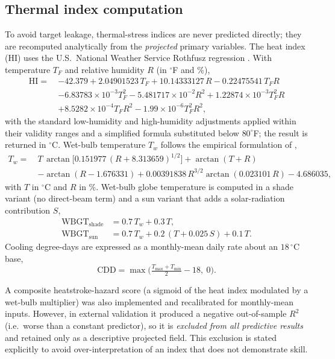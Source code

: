 \documentclass[review,11pt]{elsarticle}
\newcommand{\degC}{\ensuremath{^{\circ}\mathrm{C}}}
\begin{document}
\subsection{Thermal index computation}\label{sec:indices}
To avoid target leakage, thermal-stress indices are never predicted directly;
they are recomputed analytically from the \emph{projected} primary variables.
The heat index (HI) uses the U.S.\ National Weather Service Rothfusz regression
\citep{rothfusz1990}. With temperature $T_F$ and relative humidity $R$ (in
$^{\circ}$F and \%),
\begin{align}
\mathrm{HI} =\ & -42.379 + 2.04901523\,T_F + 10.14333127\,R
     - 0.22475541\,T_F R \nonumber\\
   & - 6.83783\!\times\!10^{-3} T_F^{2}
     - 5.481717\!\times\!10^{-2} R^{2}
     + 1.22874\!\times\!10^{-3} T_F^{2} R \nonumber\\
   & + 8.5282\!\times\!10^{-4} T_F R^{2}
     - 1.99\!\times\!10^{-6} T_F^{2} R^{2},
\label{eq:hi}
\end{align}
with the standard low-humidity and high-humidity adjustments applied within
their validity ranges and a simplified formula substituted below $80^{\circ}$F;
the result is returned in $\degC$. Wet-bulb temperature $T_w$ follows the
empirical formulation of \citet{stull2011},
\begin{align}
T_w =\ & T\,\arctan\!\big[0.151977\,(R+8.313659)^{1/2}\big]
       + \arctan(T+R) \nonumber\\
     & - \arctan(R-1.676331)
       + 0.00391838\,R^{3/2}\arctan(0.023101\,R) - 4.686035,
\label{eq:wetbulb}
\end{align}
with $T$ in $\degC$ and $R$ in \%. Wet-bulb globe temperature is computed in a
shade variant (no direct-beam term) and a sun variant that adds a
solar-radiation contribution $S$,
\begin{align}
\mathrm{WBGT}_{\text{shade}} &= 0.7\,T_w + 0.3\,T, \label{eq:wbgtshade}\\
\mathrm{WBGT}_{\text{sun}}   &= 0.7\,T_w + 0.2\,(T + 0.025\,S) + 0.1\,T.
\label{eq:wbgtsun}
\end{align}
Cooling degree-days are expressed as a monthly-mean daily rate about an
$18\,\degC$ base,
\begin{equation}
\mathrm{CDD}=\max\!\Big(\tfrac{T_{\max}+T_{\min}}{2}-18,\ 0\Big).
\label{eq:cdd}
\end{equation}

A composite heatstroke-hazard score (a sigmoid of the heat index modulated by a
wet-bulb multiplier) was also implemented and recalibrated for monthly-mean
inputs. However, in external validation it produced a negative out-of-sample
$R^{2}$ (i.e.\ worse than a constant predictor), so it is \emph{excluded from all
predictive results} and retained only as a descriptive projected field. This
exclusion is stated explicitly to avoid over-interpretation of an index that
does not demonstrate skill.
\end{document}
